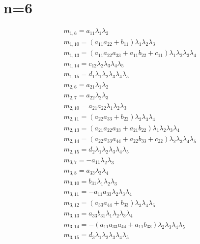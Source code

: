 \documentclass{article}
\begin{document}
\section{n=6}
\begin{align*}
&m_{1,6}=a_{11} \lambda_{1} \lambda_{2}\\
&m_{1,10}={\left(a_{11} a_{22} + b_{11}\right)} \lambda_{1} \lambda_{2} \lambda_{3}\\
&m_{1,13}={\left(a_{11} a_{22} a_{33} + a_{11} b_{22} + c_{11}\right)} \lambda_{1} \lambda_{2} \lambda_{3} \lambda_{4}\\
&m_{1,14}=c_{12} \lambda_{2} \lambda_{3} \lambda_{4} \lambda_{5}\\
&m_{1,15}=d_{1} \lambda_{1} \lambda_{2} \lambda_{3} \lambda_{4} \lambda_{5}\\
&m_{2,6}=a_{21} \lambda_{1} \lambda_{2}\\
&m_{2,7}=a_{22} \lambda_{2} \lambda_{3}\\
&m_{2,10}=a_{21} a_{22} \lambda_{1} \lambda_{2} \lambda_{3}\\
&m_{2,11}={\left(a_{22} a_{33} + b_{22}\right)} \lambda_{2} \lambda_{3} \lambda_{4}\\
&m_{2,13}={\left(a_{21} a_{22} a_{33} + a_{21} b_{22}\right)} \lambda_{1} \lambda_{2} \lambda_{3} \lambda_{4}\\
&m_{2,14}={\left(a_{22} a_{33} a_{44} + a_{22} b_{33} + c_{22}\right)} \lambda_{2} \lambda_{3} \lambda_{4} \lambda_{5}\\
&m_{2,15}=d_{2} \lambda_{1} \lambda_{2} \lambda_{3} \lambda_{4} \lambda_{5}\\
&m_{3,7}=-a_{11} \lambda_{2} \lambda_{3}\\
&m_{3,8}=a_{33} \lambda_{3} \lambda_{4}\\
&m_{3,10}=b_{31} \lambda_{1} \lambda_{2} \lambda_{3}\\
&m_{3,11}=-a_{11} a_{33} \lambda_{2} \lambda_{3} \lambda_{4}\\
&m_{3,12}={\left(a_{33} a_{44} + b_{33}\right)} \lambda_{3} \lambda_{4} \lambda_{5}\\
&m_{3,13}=a_{33} b_{31} \lambda_{1} \lambda_{2} \lambda_{3} \lambda_{4}\\
&m_{3,14}=-{\left(a_{11} a_{33} a_{44} + a_{11} b_{33}\right)} \lambda_{2} \lambda_{3} \lambda_{4} \lambda_{5}\\
&m_{3,15}=d_{3} \lambda_{1} \lambda_{2} \lambda_{3} \lambda_{4} \lambda_{5}\\
\end{align*}
\end{document}
